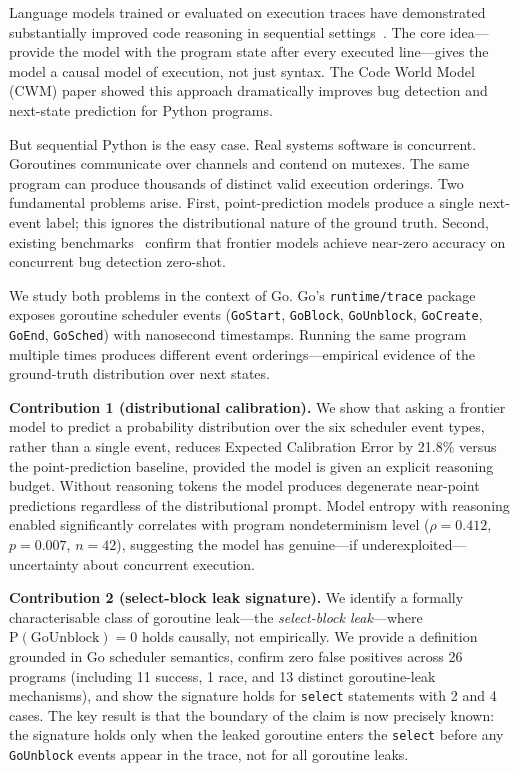 \documentclass[sigconf,review,anonymous]{acmart}
\begin{document}
Language models trained or evaluated on execution traces have demonstrated
substantially improved code reasoning in sequential settings~\cite{meta2025cwm}.
The core idea---provide the model with the program state after every executed
line---gives the model a causal model of execution, not just syntax. The Code
World Model (CWM) paper showed this approach dramatically improves bug detection
and next-state prediction for Python programs.

But sequential Python is the easy case. Real systems software is concurrent.
Goroutines communicate over channels and contend on mutexes. The same program can
produce thousands of distinct valid execution orderings. Two fundamental problems
arise. First, point-prediction models produce a single next-event label; this
ignores the distributional nature of the ground truth. Second, existing
benchmarks~\cite{concur2026} confirm that frontier models achieve near-zero
accuracy on concurrent bug detection zero-shot.

We study both problems in the context of Go. Go's \texttt{runtime/trace} package
exposes goroutine scheduler events (\texttt{GoStart}, \texttt{GoBlock},
\texttt{GoUnblock}, \texttt{GoCreate}, \texttt{GoEnd}, \texttt{GoSched}) with
nanosecond timestamps. Running the same program multiple times produces different
event orderings---empirical evidence of the ground-truth distribution over next
states.

\textbf{Contribution 1 (distributional calibration).} We show that asking a
frontier model to predict a probability distribution over the six scheduler event
types, rather than a single event, reduces Expected Calibration Error by 21.8\%
versus the point-prediction baseline, provided the model is given an explicit
reasoning budget. Without reasoning tokens the model produces degenerate near-point
predictions regardless of the distributional prompt. Model entropy with reasoning
enabled significantly correlates with program nondeterminism level
($\rho{=}0.412$, $p{=}0.007$, $n{=}42$), suggesting the model has genuine---if
underexploited---uncertainty about concurrent execution.

\textbf{Contribution 2 (select-block leak signature).} We identify a
formally characterisable class of goroutine leak---the \emph{select-block
leak}---where $\mathrm{P(GoUnblock)=0}$ holds causally, not empirically.
We provide a definition grounded in Go scheduler semantics, confirm zero false
positives across 26 programs (including 11 success, 1 race, and 13 distinct
goroutine-leak mechanisms), and show the signature holds for \texttt{select}
statements with 2 and 4 cases. The key result is that the boundary of the claim is
now precisely known: the signature holds only when the leaked goroutine enters the
\texttt{select} before any \texttt{GoUnblock} events appear in the trace, not for
all goroutine leaks.
\end{document}
